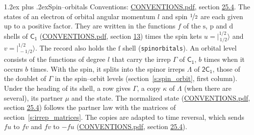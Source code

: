 \documentclass[10pt,a4paper]{article}
\makeatletter
\renewcommand\section{\@startsection{section}{1}{\z@}{-3ex plus -1ex minus -.2ex}%
  {1.2ex plus .2ex}{\normalfont\large\sffamily\bfseries\color{parttitle}}}
\numberwithin{equation}{section}
\newcommand{\grp}[1]{\mathsf{#1}}
\newcommand{\orbital}[1]{\mathrm{#1}}
\newcommand{\mult}{\kappa}
\newcommand{\intx}{\mu}
\newcommand{\jm}[2]{\bigl\lvert{}^{#1}_{\,#2}\bigr\rangle}
\makeatother
\begin{document}
\section{Spin--orbitals}\label{s:spin_orbitals}
Conventions: \href{../../CONVENTIONS.pdf}{CONVENTIONS.pdf}, section \href{../../CONVENTIONS.pdf\#conv.25.4}{25.4}.
\leavevmode\label{n:index.orbital.l}The states of an electron of orbital angular momentum $l$ and spin $\nicefrac{1}{2}$ are each given up to a positive factor. \label{n:local.spinor.uv}\label{n:local.function.f}They are written in the functions $f$ of the $\orbital{s}$, $\orbital{p}$ and $\orbital{d}$ shells of \href{../../../rotation/data/pdf/C1.pdf}{$\grp{C_{1}}$} (\href{../../CONVENTIONS.pdf}{CONVENTIONS.pdf}, section \href{../../../rotation/CONVENTIONS.pdf\#conv.13}{13}) times the spin kets $u = \jm{1/2}{1/2}$ and $v = \jm{1/2}{-1/2}$. The record also holds the $\orbital{f}$ shell (\texttt{spinorbitals}). An orbital level consists of the functions of degree $l$ that carry the irrep $\Gamma$ of \href{../../../rotation/data/pdf/C1.pdf}{$\grp{C_{1}}$}, $b$ times when it occurs $b$ times. With the spin, it splits into the spinor irreps $\Lambda$ of $\grp{2C_{1}}$, those of the doublet of $\Gamma$ in the spin--orbit levels (section~\ref{s:spin_orbit}, first column). \label{n:head.state}Under the heading of its shell, a row gives $\Gamma$, a copy $\mult$ of $\Lambda$ (when there are several), its partner $\intx$ and the state. The normalized state (\href{../../CONVENTIONS.pdf}{CONVENTIONS.pdf}, section \href{../../CONVENTIONS.pdf\#conv.25.4}{25.4}) follows the partner law with the matrices of section~\ref{s:irrep_matrices}. The copies are adapted to time reversal, which sends $f u$ to $f v$ and $f v$ to $-f u$ (\href{../../CONVENTIONS.pdf}{CONVENTIONS.pdf}, section \href{../../CONVENTIONS.pdf\#conv.25.4}{25.4}).
\end{document}
